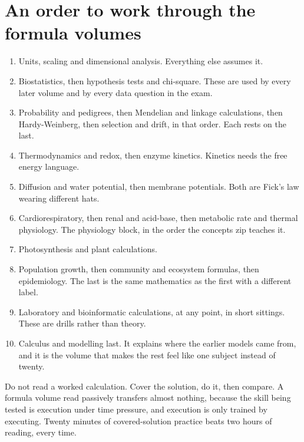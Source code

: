 \section{An order to work through the formula volumes}

\begin{keybox}[title={Dependency order}]
\begin{enumerate}
\item Units, scaling and dimensional analysis. Everything else assumes it.
\item Biostatistics, then hypothesis tests and chi-square. These are used by every
      later volume and by every data question in the exam.
\item Probability and pedigrees, then Mendelian and linkage calculations, then
      Hardy-Weinberg, then selection and drift, in that order. Each rests on the last.
\item Thermodynamics and redox, then enzyme kinetics. Kinetics needs the free energy
      language.
\item Diffusion and water potential, then membrane potentials. Both are Fick's law
      wearing different hats.
\item Cardiorespiratory, then renal and acid-base, then metabolic rate and thermal
      physiology. The physiology block, in the order the concepts zip teaches it.
\item Photosynthesis and plant calculations.
\item Population growth, then community and ecosystem formulas, then epidemiology. The
      last is the same mathematics as the first with a different label.
\item Laboratory and bioinformatic calculations, at any point, in short sittings. These
      are drills rather than theory.
\item Calculus and modelling last. It explains where the earlier models came from, and
      it is the volume that makes the rest feel like one subject instead of twenty.
\end{enumerate}
\end{keybox}

\begin{tipbox}[title={How to practise}]
Do not read a worked calculation. Cover the solution, do it, then compare. A formula
volume read passively transfers almost nothing, because the skill being tested is
execution under time pressure, and execution is only trained by executing. Twenty
minutes of covered-solution practice beats two hours of reading, every time.
\end{tipbox}


